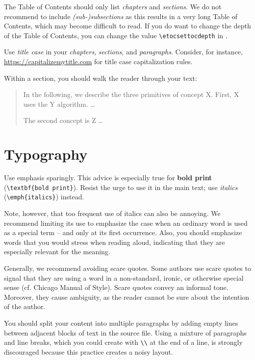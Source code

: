 The Table of Contents should only list \emph{chapters} and \emph{sections}. We do not recommend to include \emph{(sub-)subsections} as this results in a very long Table of Contents, which may become difficult to read. If you do want to change the depth of the Table of Contents, you can change the value \verb|\etocsettocdepth| in .

Use \emph{title case} in your \emph{chapters}, \emph{sections}, and \emph{paragraphs}. Consider, for instance, \url{https://capitalizemytitle.com} for title case capitalization rules.

Within a section, you should walk the reader through your text:
\begin{quote}
In the following, we describe the three primitives of concept X. First, X uses the Y algorithm. …

The second concept is Z …
\end{quote}

\section{Typography}

Use emphasis sparingly. This advice is especially true for \textbf{bold print} (\verb|\textbf{bold print}|). Resist the urge to use it in the main text; use \emph{italics} (\verb|\emph{italics}|) instead.

Note, however, that too frequent use of italics can also be annoying.%
We recommend limiting its use to emphasize the case when an ordinary word is used as a special term – and only at its first occurrence. Also, you should emphasize words that you would stress when reading aloud, indicating that they are especially relevant for the meaning.


Generally, we recommend avoiding scare quotes.%
Some authors use scare quotes to signal that they are using a word in a non-standard, ironic, or otherwise special sense (cf. Chicago Manual of Style). Scare quotes convey an informal tone. Moreover, they cause ambiguity, as the reader cannot be sure about the intention of the author.

You should split your content into multiple paragraphs by adding empty lines between adjacent blocks of text in the source file. Using a mixture of paragraphs and line breaks, which you could create with \verb|\\| at the end of a line, is strongly discouraged because this practice creates a noisy layout.

